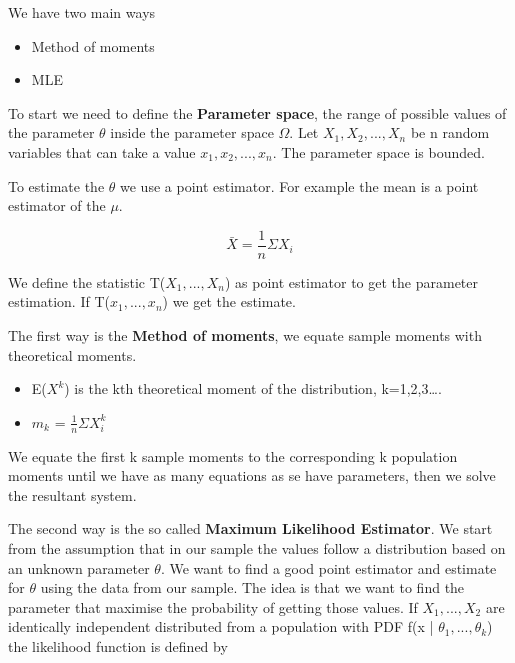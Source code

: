 \vspace{10pt}

We have two main ways
\begin{itemize}
    \item Method of moments
    \item MLE
\end{itemize}

\vspace{10pt}

To start we need to define the \textbf{Parameter space}, the range of possible values of the parameter $\theta$ inside the parameter space $\Omega$.
Let $X_1, X_2, ..., X_n$ be n random variables that can take a value $x_1, x_2, ..., x_n$.
The parameter space is bounded.

\vspace{10pt}

To estimate the $\theta$ we use a point estimator. For example the mean is a point estimator of the $\mu$.

\begin{equation}
    \bar{X} = \frac{1}{n} \Sigma X_i
\end{equation}

We define the statistic T($X_1, ..., X_n$) as point estimator to get the parameter estimation.
If T($x_1, ..., x_n$) we get the estimate.


\vspace{10pt}

The first way is the \textbf{Method of moments}, we equate sample moments with theoretical moments.

\begin{itemize}
    \item E($X^k$) is the kth theoretical moment of the distribution, k=1,2,3\dots.
    \item $m_k$ = $ \frac{1}{n} \Sigma X_i^k$
\end{itemize}

We equate the first k sample moments to the corresponding k population moments until we have as many equations as se have
parameters, then we solve the resultant system.

\vspace{10pt}

The second way is the so called \textbf{Maximum Likelihood Estimator}. We start from the
assumption that in our sample the values follow a distribution based on an unknown 
parameter $\theta$. We want to find a good point estimator and estimate for $\theta$ using
the data from our sample. The idea is that we want to find the parameter that maximise
the probability of getting those values. If $X_1, ..., X_2$ are identically independent 
distributed  from a population with PDF f(x | $\theta_1, ..., \theta_k$) the likelihood 
function is defined by

